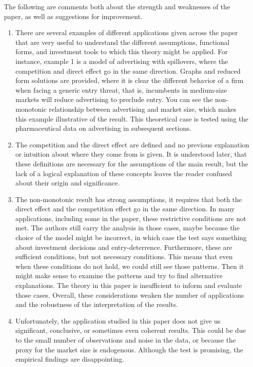 \documentclass{article}
\theoremstyle{definition}
\begin{document}
The following are comments both about the strength and weaknesses of the paper, as well as suggestions for improvement. 
\begin{enumerate}
    \item There are several examples of different applications given across the paper that are very useful to understand the different assumptions, functional forms, and investment tools to which this theory might be applied. For instance, example 1 is a model of advertising with spillovers, where the competition and direct effect go in the same direction. Graphs and reduced form solutions are provided, where it is clear the different behavior of a firm when facing a generic entry threat, that is, incumbents in medium-size markets will reduce advertising to preclude entry. You can see the non-monotonic relationship between advertising and market size, which makes this example illustrative of the result. This theoretical case is tested using the pharmaceutical data on advertising in subsequent sections. 
    
    \item The competition and the direct effect are defined and no previous explanation or intuition about where they come from is given. It is understood later, that these definitions are necessary for the assumptions of the main result, but the lack of a logical explanation of these concepts leaves the reader confused about their origin and significance. 
    
    \item The non-monotonic result has strong assumptions, it requires that both the direct effect and the competition effect go in the same direction. In many applications, including some in the paper, these restrictive conditions are not met. The authors still carry the analysis in those cases, maybe because the choice of the model might be incorrect, in which case the test says something about investment decisions and entry-deterrence. Furthermore, these are sufficient conditions, but not necessary conditions. This means that even when these conditions do not hold, we could still see those patterns. Then it might make sense to examine the patterns and try to find alternative explanations. The theory in this paper is insufficient to inform and evaluate those cases. Overall, these considerations weaken the number of applications and the robustness of the interpretation of the results.
    
\item Unfortunately, the application studied in this paper does not give us significant, conclusive, or sometimes even coherent results. This could be due to the small number of observations and noise in the data, or because the proxy for the market size is endogenous. Although the test is promising, the empirical findings are disappointing. 
    

\end{enumerate}
\end{document}
